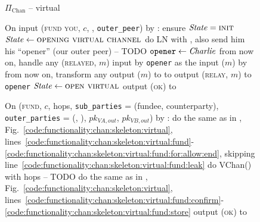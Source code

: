 \begin{figure}[H]
  \begin{protocolbox}{$\Pi_{\mathrm{Chan}}$ -- virtual}
    \begin{algorithmic}[1]
      \State {}
      \State {}
      \State On input (\textsc{fund you}, $c$, \bob, \texttt{outer\_peer}) by \charlie:
      \label{code:protocol:chan:skeleton:vchan:fund-you}
      \Indent
        \State ensure $\mathit{State} = \textsc{init}$
        \State $\mathit{State} \gets \textsc{opening virtual channel}$
        \label{code:protocol:chan:skeleton:vchan:fund-you:state}
        \State do LN with \bob{}, also send him his ``opener'' (our outer peer) -- TODO
        \label{code:protocol:chan:skeleton:vchan:ln}
        \State $\mathtt{opener} \gets \mathit{Charlie}$
        \State from now on, handle any (\textsc{relayed}, $m$) input by
        \texttt{opener} as the input ($m$) by \environment
        \State from now on, transform any output ($m$) to \environment to
        output (\textsc{relay}, $m$) to \texttt{opener}
        \State $\mathit{State} \gets \textsc{open virtual}$
        \State output (\textsc{ok}) to \charlie
        \label{code:protocol:chan:skeleton:vchan:fund-you:output}
      \EndIndent
      \Statex

      \State On (\textsc{fund}, $c$, hops, \texttt{sub\_parties} = (fundee,
      counterparty), \texttt{outer\_parties} = (\alice, \dave),
      $pk_{\mathit{VA}, out}$, $pk_{\mathit{VB}, out}$) by
      \environment:
      \Indent
        \State do the same as in \fchan,
        Fig.~\ref{code:functionality:chan:skeleton:virtual},
        lines~\ref{code:functionality:chan:skeleton:virtual:fund}-\ref{code:functionality:chan:skeleton:virtual:fund:for:allow:end},
        skipping line~\ref{code:functionality:chan:skeleton:virtual:fund:leak}
        \State do VChan() with hops -- TODO 
        \label{code:protocol:chan:skeleton:vchan}
        \State do the same as in \fchan,
        Fig.~\ref{code:functionality:chan:skeleton:virtual},
        lines~\ref{code:functionality:chan:skeleton:virtual:fund:confirm}-\ref{code:functionality:chan:skeleton:virtual:fund:store}
        \State output (\textsc{ok}) to \environment
      \EndIndent
      \Statex


\end{algorithmic}
\end{protocolbox}
\end{figure}
